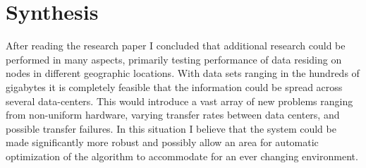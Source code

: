 \documentclass[11pt]{article}
\begin{document}
\vspace*{-.1in}
\section{Synthesis}
\label{sec:synthesis}
\vspace*{-.1in}

After reading the research paper I concluded that additional research could be performed in many aspects, primarily testing performance of data residing on nodes in different geographic locations. With data sets ranging in the hundreds of gigabytes it is completely feasible that the information could be spread across several data-centers. This would introduce a vast array of new problems ranging from non-uniform hardware, varying transfer rates between data centers, and possible transfer failures. In this situation I believe that the system could be made significantly more robust and possibly allow an area for automatic optimization of the algorithm to accommodate for an ever changing environment.



\end{document}
